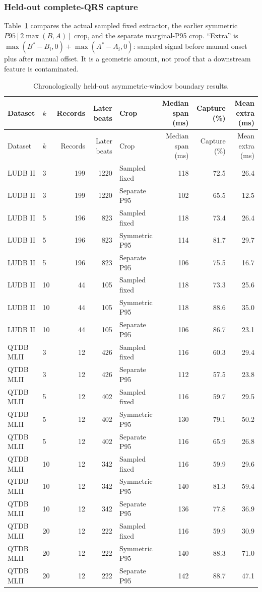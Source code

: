 \documentclass[11pt,a4paper]{article}
\begin{document}
\begin{landscape}
\subsubsection{Held-out complete-QRS capture}

Table~\ref{tab:asymcapture} compares the actual sampled fixed extractor, the
earlier symmetric $P95[2\max(B,A)]$ crop, and the separate marginal-P95 crop.
``Extra'' is
$\max(B^*-B_i,0)+\max(A^*-A_i,0)$: sampled signal before manual onset plus
after manual offset. It is a geometric amount, not proof that a downstream
feature is contaminated.

\small
\begin{longtable}{llrrlrrr}
\caption{Chronologically held-out asymmetric-window boundary results.}\label{tab:asymcapture}\\
\toprule
Dataset & $k$ & Records & Later beats & Crop & Median span (ms) & Capture (\%) & Mean extra (ms) \\
\midrule
\endfirsthead
\toprule
Dataset & $k$ & Records & Later beats & Crop & Median span (ms) & Capture (\%) & Mean extra (ms) \\
\midrule
\endhead
LUDB II & 3 & 199 & 1220 & Sampled fixed & 118 & 72.5 & 26.4 \\
LUDB II & 3 & 199 & 1220 & Separate P95 & 102 & 65.5 & 12.5 \\
LUDB II & 5 & 196 & 823 & Sampled fixed & 118 & 73.4 & 26.4 \\
LUDB II & 5 & 196 & 823 & Symmetric P95 & 114 & 81.7 & 29.7 \\
LUDB II & 5 & 196 & 823 & Separate P95 & 106 & 75.5 & 16.7 \\
LUDB II & 10 & 44 & 105 & Sampled fixed & 118 & 73.3 & 25.6 \\
LUDB II & 10 & 44 & 105 & Symmetric P95 & 118 & 88.6 & 35.0 \\
LUDB II & 10 & 44 & 105 & Separate P95 & 106 & 86.7 & 23.1 \\
QTDB MLII & 3 & 12 & 426 & Sampled fixed & 116 & 60.3 & 29.4 \\
QTDB MLII & 3 & 12 & 426 & Separate P95 & 112 & 57.5 & 23.8 \\
QTDB MLII & 5 & 12 & 402 & Sampled fixed & 116 & 59.7 & 29.5 \\
QTDB MLII & 5 & 12 & 402 & Symmetric P95 & 130 & 79.1 & 50.2 \\
QTDB MLII & 5 & 12 & 402 & Separate P95 & 116 & 65.9 & 26.8 \\
QTDB MLII & 10 & 12 & 342 & Sampled fixed & 116 & 59.9 & 29.6 \\
QTDB MLII & 10 & 12 & 342 & Symmetric P95 & 140 & 81.3 & 59.4 \\
QTDB MLII & 10 & 12 & 342 & Separate P95 & 136 & 77.8 & 36.9 \\
QTDB MLII & 20 & 12 & 222 & Sampled fixed & 116 & 59.9 & 30.9 \\
QTDB MLII & 20 & 12 & 222 & Symmetric P95 & 140 & 88.3 & 71.0 \\
QTDB MLII & 20 & 12 & 222 & Separate P95 & 142 & 88.7 & 47.1 \\
\bottomrule
\end{longtable}
\end{landscape}
\end{document}
